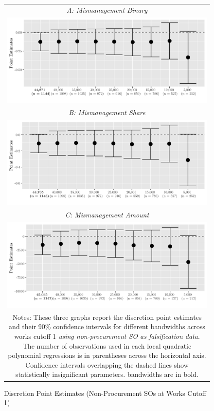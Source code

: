 \documentclass[11pt]{article}
\begin{document}
\begin{figure}[!htbp]
  \caption{Discretion Point Estimates (Non-Procurement SOs at Works Cutoff 1)}
  \label{fig:02falsification}
  \centering
  \small
  \begin{tabular}{c}
  \emph{A: Mismanagement Binary} \\
  \includegraphics[scale = .14]{02falsificationplot1} \\
  \emph{B: Mismanagement Share} \\
  \includegraphics[scale = .14]{02falsificationplot2} \\
  \emph{C: Mismanagement Amount} \\
  \includegraphics[scale = .14]{02falsificationplot3} \\
  \multicolumn{1}{p{.67\textwidth}}{\scriptsize Notes: These three graphs report the discretion point estimates and their 90\% confidence intervals for different bandwidths across works cutoff 1 \emph{using non-procurement SO as falsification data}. The number of observations used in each local quadratic polynomial regressions is in parentheses across the horizontal axis. Confidence intervals overlapping the dashed lines show statistically insignificant parameters. \citet{CalonicoOptimalDataDrivenRegression2015} bandwidths are in bold.}
  \end{tabular}
\end{figure}
\end{document}
